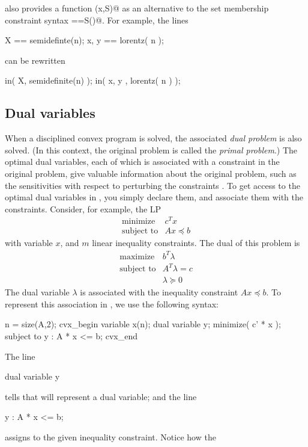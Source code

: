 \documentclass[12pt]{article}
\begin{document}
\cvx also provides a function \verb@in(x,S)@ as an alternative
to the set membership constraint syntax \verb@x==S()@.
For example, the lines
\begin{code}
	X == semidefinte(n);
	{ x, y } == lorentz( n );
\end{code}
can be rewritten
\begin{code}
	in( X, semidefinite(n) );
	in( { x, y }, lorentz( n ) );
\end{code}

\subsection{Dual variables}
When a disciplined convex program is solved, the associated 
\emph{dual problem} is also solved.
(In this context, the original problem is called the \emph{primal
problem}.)
The optimal dual variables, each of which is associated with a 
constraint in the original problem,
give valuable information about the original problem,
such as the sensitivities with respect to perturbing the constraints
\cite[Ch.5]{BV:04}.
To get access to the optimal dual variables in \cvx, you 
simply declare them, and associate them with the constraints.
Consider, for example, the LP
\[
\begin{array}{llcll}
\mbox{minimize} & c^Tx \\
\mbox{subject to} & Ax \preceq b
\end{array}
\]
with variable $x$, and $m$ linear inequality constraints.
The dual of this problem is
\[
\begin{array}{llcll}
\mbox{maximize} & b^T \lambda \\
\mbox{subject to} & A^T \lambda = c \\ & \lambda \succeq 0
\end{array}
\]
The dual variable $\lambda$ is associated with the inequality
constraint $Ax\preceq b$. To represent this association in \cvx,
we use the following syntax:
\begin{code}
	n = size(A,2);
	cvx_begin
	    variable x(n);
	    dual variable y;
	    minimize( c' * x );
	    subject to
	        y : A * x <= b;
	cvx_end
\end{code}	
The line 
\begin{code}
	dual variable y
\end{code}
tells \cvx that \verb@y@ will
represent a dual variable; and the line 
\begin{code}
	y : A * x <= b;
\end{code}
assigns \verb@y@ to the given inequality constraint. Notice how the
\end{document}
